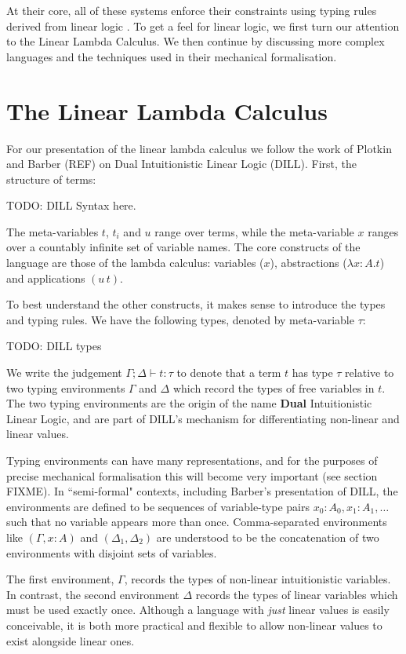 \documentclass[]{unswthesis}
\newcommand{\types}{\vdash}
\let\i\textit
\let\b\textbf
\begin{document}
At their core, all of these systems enforce their constraints using typing rules derived from linear logic \cite{girard87}. To get a feel for linear logic, we first turn our attention to the Linear Lambda Calculus. We then continue by discussing more complex languages and the techniques used in their mechanical formalisation.

\section{The Linear Lambda Calculus}

For our presentation of the linear lambda calculus we follow the work of Plotkin and Barber (REF) on Dual Intuitionistic Linear Logic (DILL). First, the structure of terms:

TODO: DILL Syntax here.

The meta-variables $t$, $t_i$ and $u$ range over terms, while the meta-variable $x$ ranges over a countably infinite set of variable names. The core constructs of the language are those of the lambda calculus: variables ($x$), abstractions ($\lambda x : A. t$) and applications $(u \, t)$.

To best understand the other constructs, it makes sense to introduce the types and typing rules. We have the following types, denoted by meta-variable $\tau$:

TODO: DILL types

We write the judgement $\Gamma; \Delta \types t : \tau$ to denote that a term $t$ has type $\tau$ relative to two typing environments $\Gamma$ and $\Delta$ which record the types of free variables in $t$. The two typing environments are the origin of the name \b{Dual} Intuitionistic Linear Logic, and are part of DILL's mechanism for differentiating non-linear and linear values.

Typing environments can have many representations, and for the purposes of precise mechanical formalisation this will become very important (see section FIXME). In ``semi-formal" contexts, including Barber's presentation of DILL, the environments are defined to be sequences of variable-type pairs $x_0 : A_0, x_1 : A_1, \dots$ such that no variable appears more than once. Comma-separated environments like $(\Gamma, x : A)$ and $(\Delta_1, \Delta_2)$ are understood to be the concatenation of two environments with disjoint sets of variables.

The first environment, $\Gamma$, records the types of non-linear intuitionistic variables. In contrast, the second environment $\Delta$ records the types of linear variables which must be used exactly once. Although a language with \i{just} linear values is easily conceivable, it is both more practical and flexible to allow non-linear values to exist alongside linear ones.
\end{document}
